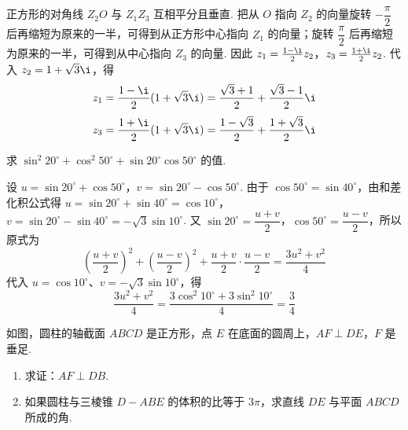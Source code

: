 \documentclass[UTF8,a4paper,oneside,11pt]{ctexbook}
\begin{document}
\begin{solution}
正方形的对角线 \(Z_2O\) 与 \(Z_1Z_3\) 互相平分且垂直. 把从 \(O\) 指向 \(Z_2\) 的向量旋转 \(-\dfrac{\pi}{2}\) 后再缩短为原来的一半，可得到从正方形中心指向 \(Z_1\) 的向量；旋转 \(\dfrac{\pi}{2}\) 后再缩短为原来的一半，可得到从中心指向 \(Z_3\) 的向量. 因此
\(z_1=\frac{1-\i}{2}z_2\)，\(z_3=\frac{1+\i}{2}z_2\).
代入 \(z_2=1+\sqrt3\i\)，得
\[
z_1=\frac{1-\i}{2}(1+\sqrt3\i)
=\frac{\sqrt3+1}{2}+\frac{\sqrt3-1}{2}\i
\]
\[
z_3=\frac{1+\i}{2}(1+\sqrt3\i)
=\frac{1-\sqrt3}{2}+\frac{1+\sqrt3}{2}\i
\]
\end{solution}

\begin{problem}
求 \(\sin^2 20^\circ + \cos^2 50^\circ + \sin 20^\circ \cos 50^\circ\) 的值.
\end{problem}

\begin{solution}
设
\(u=\sin20^\circ+\cos50^\circ\)，\(v=\sin20^\circ-\cos50^\circ\).
由于 \(\cos50^\circ=\sin40^\circ\)，由和差化积公式得
\(u=\sin20^\circ+\sin40^\circ=\cos10^\circ\)，\(v=\sin20^\circ-\sin40^\circ=-\sqrt3\sin10^\circ\).
又 \(\sin20^\circ=\dfrac{u+v}{2}\)，\(\cos50^\circ=\dfrac{u-v}{2}\)，所以原式为
\[
\left(\frac{u+v}{2}\right)^2+\left(\frac{u-v}{2}\right)^2
+\frac{u+v}{2}\cdot\frac{u-v}{2}
=\frac{3u^2+v^2}{4}
\]
代入 \(u=\cos10^\circ\)、\(v=-\sqrt3\sin10^\circ\)，得
\[
\frac{3u^2+v^2}{4}
=\frac{3\cos^2 10^\circ+3\sin^2 10^\circ}{4}
=\frac34
\]
\end{solution}

\begin{problem}
如图，圆柱的轴截面 \(ABCD\) 是正方形，点 \(E\) 在底面的圆周上，\(AF \perp DE\)，\(F\) 是垂足.

\begin{enumerate}
\item 求证：\(AF \perp DB\).

\item 如果圆柱与三棱锥 \(D - ABE\) 的体积的比等于 \(3\pi\)，求直线 \(DE\) 与平面 \(ABCD\) 所成的角.
\end{enumerate}

\end{problem}
\end{document}
